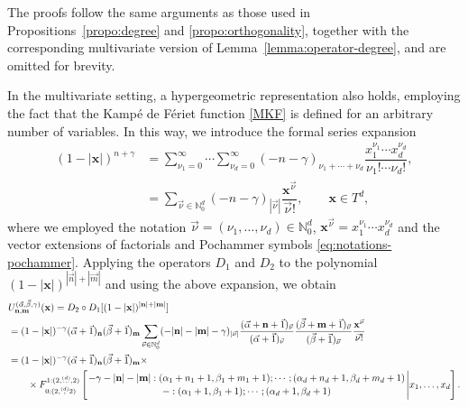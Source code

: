 \documentclass[11pt,reqno]{amsart}
\newcommand{\KF}[5]{F^{#1}_{#2}\left[{#3\atop #4}\Bigg\vert #5\right]}
\newcommand{\NN}{\mathbb{N}}
\theoremstyle{definition}
\begin{document}
The proofs follow the same arguments as those used in Propositions~\ref{propo:degree} and \ref{propo:orthogonality}, together with the corresponding multivariate version of Lemma~\ref{lemma:operator-degree}, and are omitted for brevity.

In the multivariate setting, a hypergeometric representation also holds, employing the fact that the Kampé de Fériet function \eqref{MKF} is defined for an arbitrary number of variables. In this way, we introduce the formal series expansion
\begin{equation*}
\begin{aligned}
        (1-|\mathbf x|)^{n+\gamma}&=\sum_{\nu_1=0}^\infty\cdots\sum_{\nu_d=0}^{\infty}(-n-\gamma)_{\nu_1+\cdots+\nu_d}\dfrac{x_1^{\nu_1}\cdots x_d^{\nu_d}}{\nu_1 !\cdots \nu_d!}, \\
        &= \sum_{\vec\nu\in\mathbb N_0^d}(-n-\gamma)_{|\vec \nu|} \dfrac{\mathbf x^{\vec \nu}}{\vec \nu!},\qquad \mathbf x \in T^d,
\end{aligned}
\end{equation*}
where we employed the notation $\vec\nu=(\nu_1,\dots,\nu_d)\in\NN^d_0$, $\mathbf x^{\vec \nu}=x_1^{\nu_1}\cdots x_d^{\nu_d}$ and the vector extensions of factorials and Pochammer symbols \eqref{eq:notations-pochammer}. Applying the operators $D_1$ and $D_2$ to the polynomial $(1-|\mathbf x|)^{|\vec n|+|\vec m|}$ and using the above expansion, we obtain
\begin{equation*}
    \begin{aligned}
        &U^{(\vec \alpha,\vec \beta,\gamma)}_{\mathbf n,\mathbf m}(\mathbf x)= D_2\circ D_1[(1-|\mathbf x|)^{|\mathbf n|+|\mathbf m|}]\\
        &= (1-|\mathbf x|)^{-\gamma} (\vec\alpha+\vec 1)_{\mathbf n}(\vec\beta+\vec 1)_{\mathbf m}\sum_{\vec\nu\in\mathbb N^d_0}(-|\mathbf n|-|\mathbf m|-\gamma)_{|\vec \nu|}\dfrac{(\vec\alpha+\mathbf n +\vec 1)_{\vec\nu}}{(\vec\alpha+\vec 1)_{\vec \nu}}\dfrac{(\vec\beta+\mathbf m +\vec 1)_{\vec\nu}}{(\vec\beta+\vec 1)_{\vec \nu}}\dfrac{\mathbf x^{\vec\nu}}{\vec\nu!}\\
        &=(1-|\mathbf x|)^{-\gamma} (\vec\alpha+\vec 1)_{\mathbf n}(\vec\beta+\vec 1)_{\mathbf m} \times \\ &\qquad \times 
        \KF{1:(2,\overset{(d)}{\dots},2)}{0:(2,\overset{(d)},2)}{-\gamma-|\mathbf n|-|\mathbf m|:(\alpha_1+n_1+1,\beta_1+m_1+1);\cdots;(\alpha_d+n_d+1,\beta_d+m_d+1)}{-:(\alpha_1+1,\beta_1+1);\cdots;(\alpha_d+1,\beta_d+1)}{x_1,\dots,x_d}.
    \end{aligned}
\end{equation*}
\end{document}
